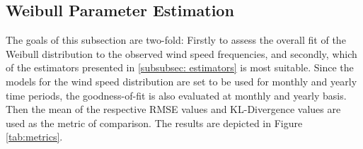 \documentclass{article}
\theoremstyle{plain}
\theoremstyle{definition}
\theoremstyle{remark}
\begin{document}

\iffalse

\subsection{Weibull Parameter Estimation}

The goals of this subsection are two-fold: Firstly to assess the overall fit of the Weibull distribution to the observed wind speed frequencies, 
and secondly, which of the estimators presented in 
\textcolor{magenta}{\ref{subsubsec: estimators}}
is most suitable. 
Since the models for the wind speed distribution are set to be used for 
monthly and yearly time periods, the goodness-of-fit is also evaluated at monthly and yearly basis.
Then the mean of the respective RMSE values and KL-Divergence values are used as the metric of comparison. 
The results are depicted in Figure \ref{tab:metrics}.
\end{document}
